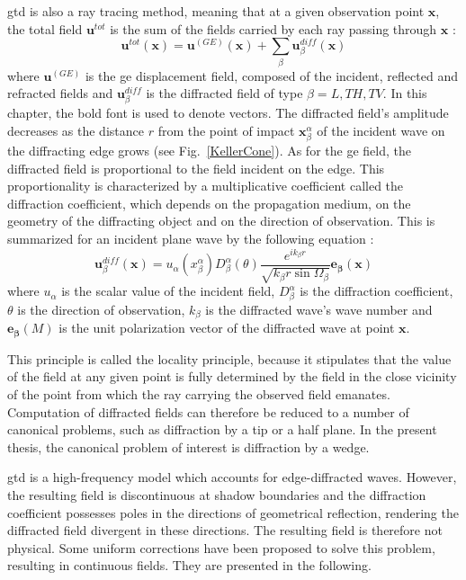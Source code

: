 \acrshort{gtd} is also a ray tracing method, meaning that at a given observation point $\mathbf{x}$, the total field $\mathbf{u}^{tot}$ is the sum of the fields carried by each ray passing through $\mathbf{x}$ :
\begin{equation}
    \mathbf{u}^{tot}(\mathbf{x})=\mathbf{u}^{(GE)}(\mathbf{x})+\sum_{\beta} \mathbf{u}^{diff}_{\beta}(\mathbf{x})
    \label{GTDtot}
\end{equation}
where $\mathbf{u}^{(GE)}$ is the \acrshort{ge} displacement field, composed of the incident, reflected and refracted fields and $\mathbf{u}^{diff}_{\beta}$ is the diffracted field of type $\beta=L,TH,TV$. In this chapter, the bold font is used to denote vectors. The diffracted field's amplitude decreases as the distance $r$ from the point of impact $\mathbf{x}_{\beta}^{\alpha}$ of the incident wave on the diffracting edge grows (see Fig.~\ref{KellerCone}). As for the \acrshort{ge} field, the diffracted field is proportional to the field incident on the edge. This proportionality is characterized by a multiplicative coefficient called the diffraction coefficient, which depends on the propagation medium, on the geometry of the diffracting object and on the direction of observation. This is summarized for an incident plane wave by the following equation :
\begin{equation}
    \mathbf{u}_{\beta}^{diff}(\mathbf{x})=u_{\alpha}(x_{\beta}^{\alpha})D_{\beta}^{\alpha}(\theta)\dfrac{e^{ik_{\beta}r}}{\sqrt{k_{\beta}r\sin\Omega_{\beta}}}\mathbf{e_{\beta}}(\mathbf{x})
    \label{C1:GTDdiff}
\end{equation}
where $u_{\alpha}$ is the scalar value of the incident field, $D_{\beta}^{\alpha}$ is the diffraction coefficient, $\theta$ is the direction of observation, $k_{\beta}$ is the diffracted wave's wave number and $\mathbf{e_{\beta}}(M)$ is the unit polarization vector of the diffracted wave at point $\mathbf{x}$.

This principle is called the locality principle, because it stipulates that the value of the field at any given point is fully determined by the field in the close vicinity of the point from which the ray carrying the observed field emanates. Computation of diffracted fields can therefore be reduced to a number of canonical problems, such as diffraction by a tip or a half plane. In the present thesis, the canonical problem of interest is diffraction by a wedge.

\acrshort{gtd} is a high-frequency model which accounts for edge-diffracted waves. However, the resulting field is discontinuous at shadow boundaries and the diffraction coefficient possesses poles in the directions of geometrical reflection, rendering the diffracted field divergent in these directions. The resulting field is therefore not physical. Some uniform corrections have been proposed to solve this problem, resulting in continuous fields. They are presented in the following. 

